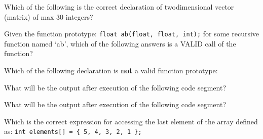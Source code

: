 \documentclass[11pt]{examdesign}
\begin{document}


\begin{multiplechoice}[title={},suppressprefix=yes,rearrange=no]

\begin{question}
Which of the following is the correct declaration of twodimensional vector (matrix) of max 30 integers?
\end{question}

\begin{question}
Given the function prototype: \texttt{float ab(float, float, int);} for some recursive function named `ab', which
of the following answers is a VALID call of the function?
\end{question}

\begin{question}
Which of the following declaration is \textbf{not} a valid function prototype:
\end{question}

\begin{question}
What will be the output after execution of the following code segment?
\end{question}

\begin{question}
What will be the output after execution of the following code segment?
\end{question}

\begin{question}
Which is the correct expression for accessing the last element of the array
defined as: \texttt{int elements[] = \{ 5, 4, 3, 2, 1 \};}
\end{question}


\end{multiplechoice}
\end{document}

